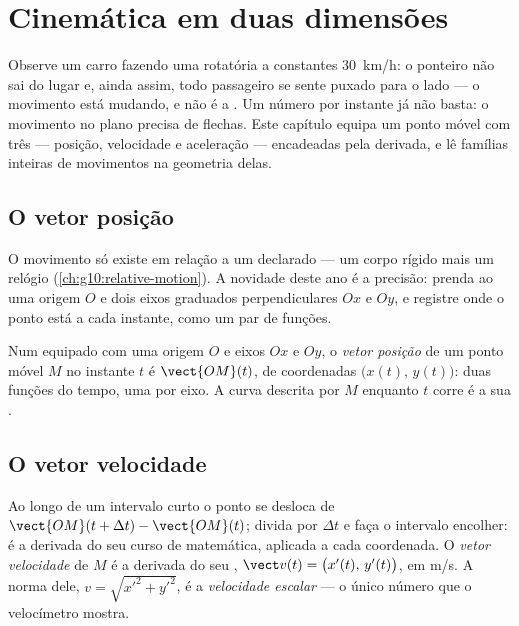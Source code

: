 \chapter{Cinemática em duas dimensões}\label{ch:g12:kinematics-2d}

Observe um carro fazendo uma rotatória a constantes \qty{30}{km/h}: o
ponteiro não sai do lugar e, ainda assim, todo passageiro se sente puxado
para o lado --- o movimento está mudando, e não é a .
Um número por instante já não basta: o movimento no plano precisa de
flechas. Este capítulo equipa um ponto móvel com três --- posição,
velocidade e aceleração --- encadeadas pela derivada, e lê famílias
inteiras de movimentos na geometria delas.

\section{O vetor posição}

O movimento só existe em relação a um  declarado --- um corpo
rígido mais um relógio (\cref{ch:g10:relative-motion}). A novidade deste
ano é a precisão: prenda ao  uma origem $O$ e dois eixos
graduados perpendiculares $Ox$ e $Oy$, e registre onde o ponto está a
cada instante, como um par de funções.

\begin{definition}\label{def:g12:kinematics-2d:position}
Num  equipado com uma origem $O$ e eixos $Ox$ e $Oy$, o
\emph{vetor posição} de um ponto móvel $M$ no
instante $t$ é $\vect{OM}(t)$, de coordenadas
$\bigl(x(t),\, y(t)\bigr)$: duas funções do tempo, uma por eixo. A curva
descrita por $M$ enquanto $t$ corre é a sua .
\end{definition}

\section{O vetor velocidade}

\begin{definition}\label{def:g12:kinematics-2d:velocity}
Ao longo de um intervalo curto o ponto se desloca de
$\vect{OM}(t+\Delta t) - \vect{OM}(t)$; divida por $\Delta t$ e faça o
intervalo encolher: é a derivada do seu curso de matemática, aplicada a
cada coordenada. O \emph{vetor velocidade} de $M$
é a derivada do seu ,
$\vect v(t) = \bigl(x'(t),\, y'(t)\bigr)$, em \unit{m/s}. A norma dele,
$v = \sqrt{x'^2 + y'^2}$, é a \emph{velocidade escalar} --- o único número que o velocímetro mostra.
\end{definition}

